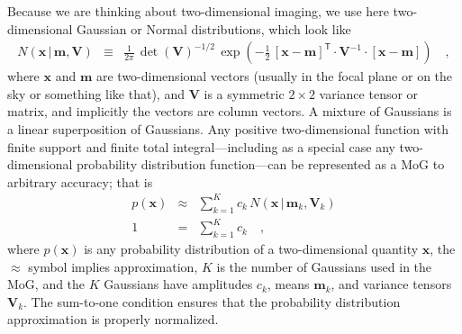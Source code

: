 \documentclass[12pt,pdftex,preprint]{aastex}
\newcommand{\tmatrix}[1]{\boldsymbol{#1}}
\newcommand{\inverse}[1]{{#1}^{-1}}
\newcommand{\transpose}[1]{{#1}^{\mathsf T}}
\newcommand{\tvector}[1]{\boldsymbol{#1}}
\newcommand{\pos}{\tvector{x}}
\newcommand{\mean}{\tvector{m}}
\newcommand{\var}{\tmatrix{V}}
\newcommand{\normal}{N}
\newcommand{\given}{\,|\,}
\begin{document}
Because we are thinking about two-dimensional imaging, we use here
two-dimensional Gaussian or Normal distributions, which look like
\begin{eqnarray}\displaystyle
\normal(\pos\given\mean,\var) &\equiv& \frac{1}{2\pi}\,\det(\var)^{-1/2}\,\exp(-\frac{1}{2}\,\transpose{[\pos-\mean]}\cdot\inverse{\var}\cdot[\pos-\mean])
\quad ,
\end{eqnarray}
where $\pos$ and $\mean$ are two-dimensional vectors (usually in the
focal plane or on the sky or something like that), and $\var$ is a
symmetric $2\times 2$ variance tensor or matrix, and implicitly the
vectors are column vectors.  A mixture of Gaussians is a linear
superposition of Gaussians.  Any positive two-dimensional function
with finite support and finite total integral---including as a special
case any two-dimensional probability distribution function---can be
represented as a MoG to arbitrary accuracy; that is
\begin{eqnarray}
p(\pos) &\approx& \sum_{k=1}^K c_k\,\normal(\pos\given\mean_k,\var_k)
\\
1 &=& \sum_{k=1}^K c_k
\quad ,
\end{eqnarray}
where $p(\pos)$ is any probability distribution of a two-dimensional
quantity $\pos$, the $\approx$ symbol implies approximation, $K$ is
the number of Gaussians used in the MoG, and the $K$ Gaussians
have amplitudes $c_k$, means $\mean_k$, and variance tensors $\var_k$.
The sum-to-one condition ensures that the probability distribution
approximation is properly normalized.
\end{document}
